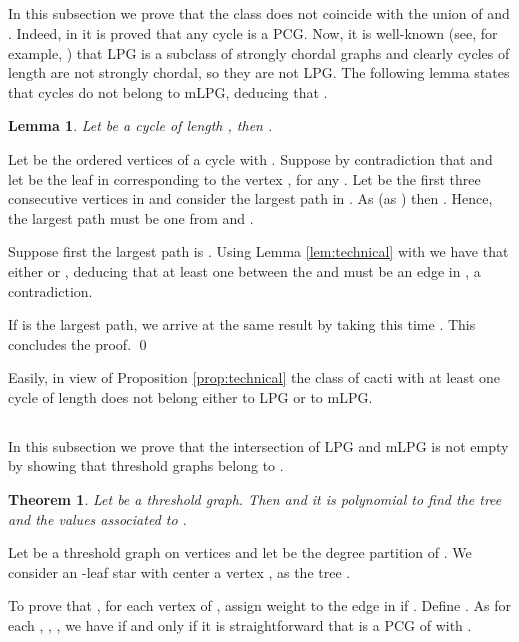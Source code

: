 \documentclass[dvipdfm]{llncs}
\newtheorem{Theorem}{Theorem}
\newtheorem{Lemma}{Lemma}
\begin{document}
\subsection{} \label{subsec:union}
In this subsection we prove that the  class does not coincide with the union of  and . Indeed, in \cite{YHR09} it is proved that any cycle is a PCG. Now, it is well-known (see, for example, \cite{B}) that LPG is a subclass of strongly chordal graphs and clearly cycles of length  are not strongly chordal, so they are not LPG. The following lemma states that cycles do not belong to mLPG, deducing that .

\begin{Lemma}
Let  be a cycle of length , then .
\end{Lemma}
\proof
Let  be the ordered vertices of a cycle  with . Suppose by contradiction that  and let 
be the leaf in  corresponding to the vertex , for any .  Let  be the first three consecutive vertices in  and consider the largest path in . As  (as ) then . Hence, the largest path must be one from  and . 

Suppose first the largest path is . Using Lemma \ref{lem:technical} with  we have that either  or , deducing that at least one between the  and  must be an edge in , a contradiction. 

If  is the largest path, we arrive at the same result  by taking this time . This concludes the proof. \qed

Easily, in view of Proposition \ref{prop:technical} the class  of cacti with at least one cycle of length  does not belong either to LPG or to mLPG. 

\subsection{}\label{subsec:intersection}

In this subsection we prove that the intersection of LPG and mLPG is not empty by showing that threshold graphs belong to . 

\begin{Theorem}\label{theo:threshold}
Let  be a threshold graph. Then  and it is polynomial to find the tree  and the values  associated to .
\end{Theorem}

\proof
Let  be a threshold graph on  vertices and let  be the degree partition of .  We consider an -leaf star with center a vertex , as the tree . 

To prove that , for each vertex  of , assign weight   to the edge  in  if . Define .  As for each , , , we have  if and only if  it is straightforward that  is a PCG of  with . 
\end{document}
